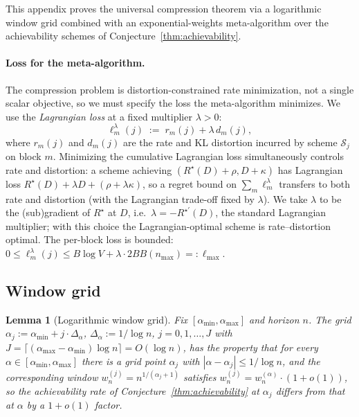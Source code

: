 \documentclass[11pt]{article}
\theoremstyle{plain}
\newtheorem{lemma}[theorem]{Lemma}
\theoremstyle{definition}
\theoremstyle{remark}
\begin{document}
This appendix proves the universal compression theorem via a
logarithmic window grid combined with an exponential-weights
meta-algorithm over the achievability schemes of
Conjecture~\ref{thm:achievability}.

\paragraph{Loss for the meta-algorithm.}
The compression problem is distortion-constrained rate
minimization, not a single scalar objective, so we must specify
the loss the meta-algorithm minimizes. We use the
\emph{Lagrangian loss} at a fixed multiplier $\lambda > 0$:
\[
\ell_m^\lambda(j)
\;:=\;
r_m(j) + \lambda\, d_m(j),
\]
where $r_m(j)$ and $d_m(j)$ are the rate and KL distortion incurred
by scheme $\mathcal{S}_j$ on block $m$. Minimizing the cumulative
Lagrangian loss simultaneously controls rate and distortion: a
scheme achieving $(R^\star(D) + \rho, D + \kappa)$ has Lagrangian
loss $R^\star(D) + \lambda D + (\rho + \lambda \kappa)$, so a
regret bound on $\sum_m \ell_m^\lambda$ transfers to both rate and
distortion (with the Lagrangian trade-off fixed by $\lambda$). We
take $\lambda$ to be the (sub)gradient of $R^\star$ at $D$, i.e.\
$\lambda = -R^{\star\prime}(D)$, the standard Lagrangian
multiplier; with this choice the Lagrangian-optimal scheme is
rate--distortion optimal. The per-block loss is bounded:
$0 \leq \ell_m^\lambda(j) \leq B\log V + \lambda \cdot 2B B(n_{\max})
=: \ell_{\max}$.

\subsection{Window grid}

\begin{lemma}[Logarithmic window grid]\label{lem:grid}
Fix $[\alpha_{\min}, \alpha_{\max}]$ and horizon $n$. The grid
$\alpha_j := \alpha_{\min} + j \cdot \Delta_\alpha$,
$\Delta_\alpha := 1/\log n$,
$j = 0, 1, \ldots, J$ with
$J = \lceil (\alpha_{\max} - \alpha_{\min}) \log n \rceil =
O(\log n)$, has the property that for every
$\alpha \in [\alpha_{\min}, \alpha_{\max}]$ there is a grid point
$\alpha_j$ with $|\alpha - \alpha_j| \leq 1/\log n$, and the
corresponding window $w_n^{(j)} = n^{1/(\alpha_j+1)}$ satisfies
$w_n^{(j)} = w_n^{(\alpha)} \cdot (1 + o(1))$, so the
achievability rate of Conjecture~\ref{thm:achievability} at
$\alpha_j$ differs from that at $\alpha$ by a $1+o(1)$ factor.
\end{lemma}
\end{document}
